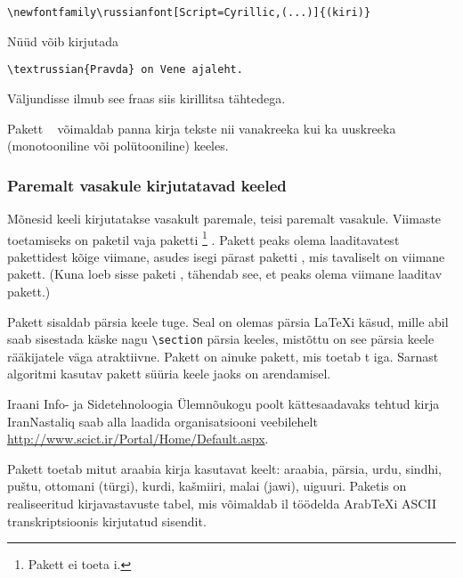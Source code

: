 \begin{lscommand}
\verb|\newfontfamily\russianfont[Script=Cyrillic,(...)]{(kiri)}|
\end{lscommand}

Nüüd võib kirjutada

\begin{code} \verb|\textrussian{Pravda} on Vene ajaleht.|
\end{code}
%
Väljundisse ilmub see fraas siis kirillitsa tähtedega.

Pakett ~\cite{xgreek} võimaldab panna
kirja tekste nii vanakreeka kui ka uuskreeka (monotooniline või
polütooniline) keeles.

\subsubsection{Paremalt vasakule kirjutatavad keeled}

Mõnesid keeli kirjutatakse vasakult paremale, teisi paremalt vasakule.
Viimaste toetamiseks on paketil  vaja paketti
\footnote{Pakett  ei toeta i.}
\cite{bidi}. Pakett  peaks olema laaditavatest pakettidest
kõige viimane, asudes isegi pärast paketti , mis
tavaliselt on viimane pakett. (Kuna  loeb sisse paketi
, tähendab see, et  peaks olema viimane
laaditav pakett.)

Pakett  \cite{xepersian} sisaldab
pärsia keele tuge. Seal on olemas pärsia \LaTeX i käsud, mille abil saab
sisestada käske nagu \verb|\section| pärsia keeles, mistõttu on see
pärsia keele rääkijatele väga atraktiivne. Pakett  on
ainuke pakett, mis toetab t iga. Sarnast
algoritmi kasutav pakett süüria keele jaoks on arendamisel.

Iraani Info- ja Sidetehnoloogia Ülemnõukogu poolt kättesaadavaks tehtud
kirja IranNastaliq saab alla laadida
organisatsiooni veebilehelt
\url{http://www.scict.ir/Portal/Home/Default.aspx}.

Pakett  \cite{arabxetex} toetab mitut araabia kirja kasutavat keelt: araabia, pärsia, urdu,
sindhi, pu\v{s}tu, ottomani (türgi), kurdi, ka\v{s}miiri, malai (jawi),
uiguuri. Paketis on realiseeritud kirjavastavuste tabel, mis võimaldab
il töödelda Arab\TeX i ASCII transkriptsioonis
kirjutatud sisendit.

